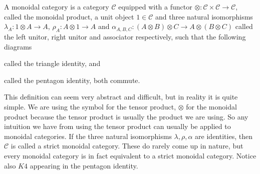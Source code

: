 \begin{definition}
A monoidal category is a category $ \mathcal{C}$ equipped with a functor $ \otimes :  \mathcal{C} \times \mathcal{C} \rightarrow \mathcal{C}$, called the monoidal product, a unit object $ 1\in \mathcal{C}$ and three natural isomorphisms $ \lambda_A : 1\otimes A \rightarrow A$, $ \rho_A : A\otimes 1\rightarrow A$ and $ \alpha_{A,B,C} : (A\otimes B)\otimes C \rightarrow A\otimes (B\otimes C)$ called the left unitor, right unitor and associator respectively, such that the following diagrams 
\begin{center}
\end{center}
called the triangle identity, and 
\begin{center}
\end{center}
called the pentagon identity, both commute. 
\end{definition}

This definition can seem very abstract and difficult, but in reality it is quite simple. We are using the symbol for the tensor product, $ \otimes $ for the monoidal product because the tensor product is usually the product we are using. So any intuition we have from using the tensor product can usually be applied to monoidal categories. If the three natural isomorphisms $ \lambda, \rho, \alpha $ are identities, then $ \mathcal{C}$ is called a strict monoidal category. These do rarely come up in nature, but every monoidal category is in fact equivalent to a strict monoidal category. Notice also $K4$ appearing in the pentagon identity. 

